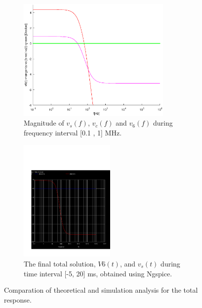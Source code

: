 \begin{figure}[H]

\begin{subfigure}{0.5\textwidth}
\includegraphics[width=0.9\linewidth, height=6cm]{magnitude.eps} 
\caption{Magnitude of $v_s(f)$,  $v_c(f)$  and $v_6(f)$ during frequency interval [0.1 , 1] MHz.}
\label{fig:theo_third}
\end{subfigure}
\begin{subfigure}{0.5\textwidth}
\includegraphics[width=0.9\linewidth, height=6cm]{acm.pdf}
\caption{The final total solution, $V6(t)$,  and $v_s(t)$ during time interval [-5, 20] ms, obtained using Ngspice.}
\label{fig:total}
\end{subfigure}

\caption{Comparation of theoretical and simulation analysis for the total response.}
\label{fig:compar_2}
\end{figure}




















